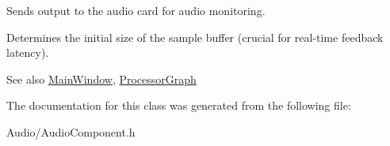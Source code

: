 Sends output to the audio card for audio monitoring.

Determines the initial size of the sample buffer (crucial for real-\/time feedback latency).

\begin{DoxySeeAlso}{See also}
\hyperlink{classMainWindow}{Main\-Window}, \hyperlink{classProcessorGraph}{Processor\-Graph} 
\end{DoxySeeAlso}


The documentation for this class was generated from the following file\-:\begin{DoxyCompactItemize}
\item 
Audio/Audio\-Component.\-h\end{DoxyCompactItemize}

